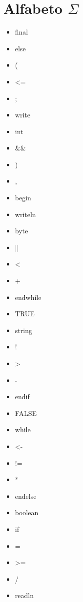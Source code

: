 \section{Alfabeto $\Sigma$} 
\begin{itemize}
\item final
\item else
\item (
\item <=
\item ;
\item write
\item int
\item \&\&
\item )
\item ,
\item begin
\item writeln
\item byte
\item ||
\item <
\item +
\item endwhile
\item TRUE
\item string
\item !
\item >
\item -
\item endif
\item FALSE
\item while
\item <-
\item !=
\item *
\item endelse
\item boolean
\item if
\item =
\item >=
\item /
\item readln 
\end{itemize}

